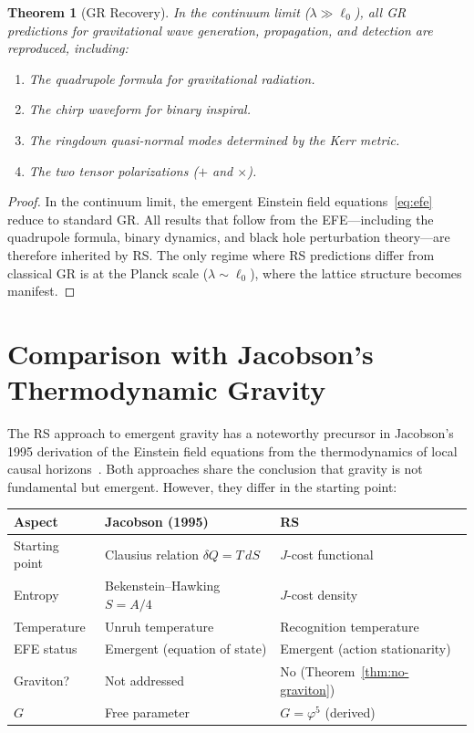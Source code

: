 \documentclass[12pt,a4paper]{article}
\newtheorem{theorem}{Theorem}[section]
\theoremstyle{definition}
\theoremstyle{remark}
\begin{document}
\begin{theorem}[GR Recovery]
\label{thm:gr-recovery}
In the continuum limit ($\lambda \gg \ell_0$), all GR predictions
for gravitational wave generation, propagation, and detection are
reproduced, including:
\begin{enumerate}[label=(\roman*)]
  \item The quadrupole formula for gravitational radiation.
  \item The chirp waveform for binary inspiral.
  \item The ringdown quasi-normal modes determined by the Kerr
        metric.
  \item The two tensor polarizations ($+$ and $\times$).
\end{enumerate}
\end{theorem}

\begin{proof}
In the continuum limit, the emergent Einstein field
equations~\eqref{eq:efe} reduce to standard GR.  All results
that follow from the EFE---including the quadrupole formula,
binary dynamics, and black hole perturbation theory---are
therefore inherited by RS.  The only regime where RS predictions
differ from classical GR is at the Planck scale ($\lambda \sim
\ell_0$), where the lattice structure becomes manifest.
\end{proof}

\section{Comparison with Jacobson's Thermodynamic Gravity}
\label{sec:jacobson}

The RS approach to emergent gravity has a noteworthy precursor in
Jacobson's 1995 derivation of the Einstein field equations from
the thermodynamics of local causal
horizons~\cite{Jacobson1995}.  Both approaches share the
conclusion that gravity is not fundamental but emergent.
However, they differ in the starting point:

\begin{center}
\renewcommand{\arraystretch}{1.3}
\begin{tabular}{@{}lll@{}}
\toprule
\textbf{Aspect} & \textbf{Jacobson (1995)} & \textbf{RS} \\
\midrule
Starting point & Clausius relation $\delta Q = T\,dS$ &
  $J$-cost functional \\
Entropy & Bekenstein--Hawking $S = A/4$ & $J$-cost density \\
Temperature & Unruh temperature & Recognition temperature \\
EFE status & Emergent (equation of state) & Emergent
  (action stationarity) \\
Graviton? & Not addressed & No (Theorem~\ref{thm:no-graviton}) \\
$G$ & Free parameter & $G = \varphi^5$ (derived) \\
\bottomrule
\end{tabular}
\end{center}
\end{document}
